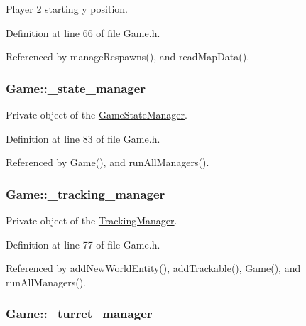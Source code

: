 Player 2 starting y position. 



Definition at line 66 of file Game.\-h.



Referenced by manage\-Respawns(), and read\-Map\-Data().

\hypertarget{classGame_aed3d39ba9be8eb05ab3b18465ae8e982}{
\subsubsection[{\-\_\-state\-\_\-manager}]{ Game\-::\-\_\-state\-\_\-manager\hspace{0.3cm}{\ttfamily [private]}}}\label{classGame_aed3d39ba9be8eb05ab3b18465ae8e982}


Private object of the \hyperlink{classGameStateManager}{Game\-State\-Manager}. 



Definition at line 83 of file Game.\-h.



Referenced by Game(), and run\-All\-Managers().

\hypertarget{classGame_af8fcc8c3d82a46d37e354de8ddde88c0}{
\subsubsection[{\-\_\-tracking\-\_\-manager}]{ Game\-::\-\_\-tracking\-\_\-manager\hspace{0.3cm}{\ttfamily [private]}}}\label{classGame_af8fcc8c3d82a46d37e354de8ddde88c0}


Private object of the \hyperlink{classTrackingManager}{Tracking\-Manager}. 



Definition at line 77 of file Game.\-h.



Referenced by add\-New\-World\-Entity(), add\-Trackable(), Game(), and run\-All\-Managers().

\hypertarget{classGame_ac2f6df412f7efa3eb8750d350dd0261a}{
\subsubsection[{\-\_\-turret\-\_\-manager}]{ Game\-::\-\_\-turret\-\_\-manager\hspace{0.3cm}{\ttfamily [private]}}}\label{classGame_ac2f6df412f7efa3eb8750d350dd0261a}


